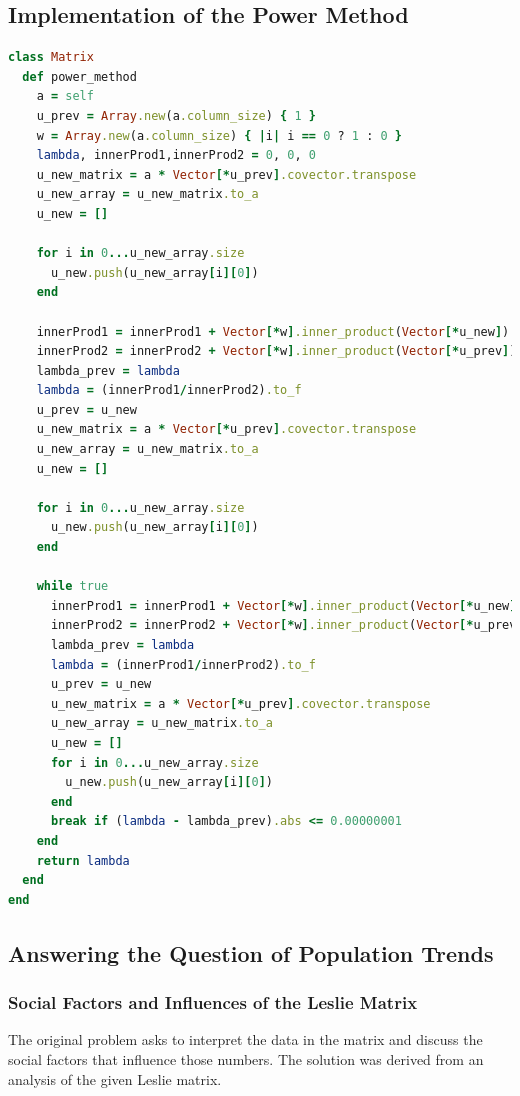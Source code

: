 \documentclass[letterpaper,12pt]{article}
\begin{document}
\subsection{Implementation of the Power Method}
\lstset{caption=Power Method}
\begin{lstlisting}[language=ruby]
class Matrix
  def power_method
    a = self
    u_prev = Array.new(a.column_size) { 1 }
    w = Array.new(a.column_size) { |i| i == 0 ? 1 : 0 }
    lambda, innerProd1,innerProd2 = 0, 0, 0
    u_new_matrix = a * Vector[*u_prev].covector.transpose
    u_new_array = u_new_matrix.to_a
    u_new = []

    for i in 0...u_new_array.size
      u_new.push(u_new_array[i][0])
    end

    innerProd1 = innerProd1 + Vector[*w].inner_product(Vector[*u_new])
    innerProd2 = innerProd2 + Vector[*w].inner_product(Vector[*u_prev])
    lambda_prev = lambda
    lambda = (innerProd1/innerProd2).to_f
    u_prev = u_new
    u_new_matrix = a * Vector[*u_prev].covector.transpose
    u_new_array = u_new_matrix.to_a
    u_new = []

    for i in 0...u_new_array.size
      u_new.push(u_new_array[i][0])
    end

    while true
      innerProd1 = innerProd1 + Vector[*w].inner_product(Vector[*u_new])
      innerProd2 = innerProd2 + Vector[*w].inner_product(Vector[*u_prev])
      lambda_prev = lambda
      lambda = (innerProd1/innerProd2).to_f
      u_prev = u_new
      u_new_matrix = a * Vector[*u_prev].covector.transpose
      u_new_array = u_new_matrix.to_a
      u_new = []
      for i in 0...u_new_array.size
        u_new.push(u_new_array[i][0])
      end
      break if (lambda - lambda_prev).abs <= 0.00000001
    end
    return lambda
  end
end
\end{lstlisting}

\subsection{Answering the Question of Population Trends}

\subsubsection{Social Factors and Influences of the Leslie Matrix}

The original problem asks to interpret the data in the matrix and discuss the
social factors that influence those numbers.
The solution was derived from an analysis of the given Leslie matrix.
\end{document}
